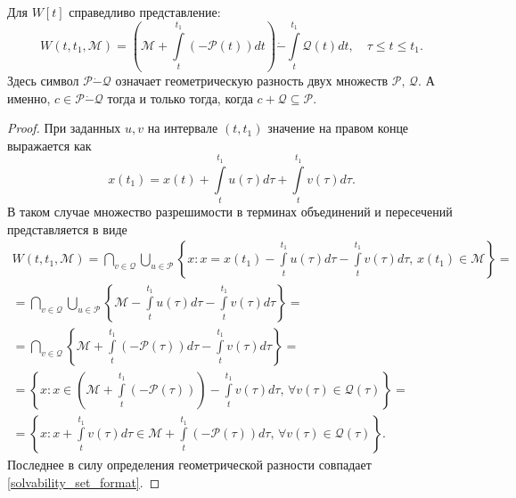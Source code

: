 \begin{statement}
    Для \( W[t] \) справедливо представление:
    \begin{equation}\label{solvability_set_format}
        W(t,t_1,\mathcal{M}) = \left( \mathcal{M} + \int\limits_t^{t_1} 
         (-\mathcal{P}(t)) dt \right) \dot{-} \int\limits_t^{t_1} \mathcal{Q}(t) dt,
         \quad \tau \le t \le t_1.
    \end{equation}
    Здесь символ \( \mathcal{P} \dot{-} \mathcal{Q} \) означает геометрическую
     разность двух множеств \( \mathcal{P}, \, \mathcal{Q}\). А именно,
     \( c \in \mathcal{P} \dot{-} \mathcal{Q} \) тогда и только тогда, когда \(c +
     \mathcal{Q} \subseteq \mathcal{P} \).
\end{statement}
\begin{proof}
    При заданных \( u, v \) на интервале \( (t, t_1 ) \) значение на правом конце
     выражается как 
    \begin{equation*}
        x(t_1) = x(t) + \int\limits_t^{t_1}u(\tau)d\tau + \int\limits_t^{t_1}
        v(\tau)d\tau.
    \end{equation*}
    В таком случае множество разрешимости в терминах объединений и пересечений 
     представляется в виде
    \begin{multline*}
        W(t, t_1, \mathcal{M}) = \bigcap\limits_{v \in \mathcal{Q}} 
         \bigcup\limits_{u \in \mathcal{P}} \left\{ x : x = x(t_1)
         -\int\limits_t^{t_1}u(\tau) d\tau - \int\limits_t^{t_1} v(\tau)
         d\tau, \, x(t_1) \in \mathcal{M} \right\} = \\
        = \bigcap\limits_{v \in \mathcal{Q}} \bigcup\limits_{u \in 
         \mathcal{P}} \left\{ \mathcal{M} - \int\limits_t^{t_1} u(\tau) d\tau
         - \int\limits_t^{t_1} v(\tau) d\tau \right\} = \\
        = \bigcap\limits_{v \in \mathcal{Q}} \left\{ \mathcal{M} +
         \int\limits_t^{t_1}(-\mathcal{P}(\tau)) d\tau - \int\limits_t^{t_1}
         v(\tau) d\tau \right\} = \\
        = \left\{ x : x \in \left( \mathcal{M} + \int\limits_t^{t_1}(- \mathcal{P}
         (\tau)) \right)  - \int\limits_t^{t_1} v(\tau) d\tau, \, \forall v(\tau)
         \in \mathcal{Q}(\tau) \right\} = \\
        = \left\{ x : x + \int\limits_t^{t_1} v(\tau) d\tau \in \mathcal{M} + 
         \int\limits_t^{t_1}(- \mathcal{P}(\tau)) d\tau, \, \forall v(\tau) \in
         \mathcal{Q}(\tau) \right\}.
    \end{multline*}
    Последнее в силу определения геометрической разности совпадает 
     \eqref{solvability_set_format}.
\end{proof}

